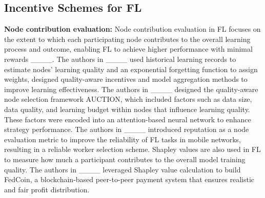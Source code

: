 \subsection{Incentive Schemes for FL}
\textbf{Node contribution evaluation:} Node contribution evaluation in FL focuses on the extent to which each participating node contributes to the overall learning process and outcome, enabling FL to achieve higher performance with minimal rewards ____. The authors in ____ used historical learning records to estimate nodes' learning quality and an exponential forgetting function to assign weights, designed quality-aware incentives and model aggregation methods to improve learning effectiveness. The authors in ____ designed the quality-aware node selection framework AUCTION, which included factors such as data size, data quality, and learning budget within nodes that influence learning quality. These factors were encoded into an attention-based neural network to enhance strategy performance. The authors in ____ introduced reputation as a node evaluation metric to improve the reliability of FL tasks in mobile networks, resulting in a reliable worker selection scheme. Shapley values are also used in FL to measure how much a participant contributes to the overall model training quality. The authors in ____ leveraged Shapley value calculation to build FedCoin, a blockchain-based peer-to-peer payment system that ensures realistic and fair profit distribution.

